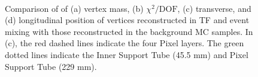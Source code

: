 \begin{figure}[!htb]
    \centering
     \\
    \caption{Comparison of of (a) vertex mass, (b) $\chi^{2} / \mathrm{DOF}$, (c) transverse, and (d) longitudinal position of \xx vertices reconstructed in TF and event mixing with those reconstructed in the background MC samples. In (c), the red dashed lines indicate the four Pixel layers. The green dotted lines indicate the Inner Support Tube (45.5 mm) and Pixel Support Tube (229 mm).}
    \label{fig:random-crossing_vertex_dist}
\end{figure}


